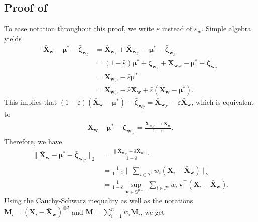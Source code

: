 \documentclass[aos,preprint,reqno]{imsart}
\newcommand\bs{\boldsymbol}
\newcommand\bmu{\boldsymbol\mu}
\newcommand\bzeta{\boldsymbol\zeta}
\newcommand\bv{\boldsymbol v}
\newcommand\bw{\boldsymbol w}
\theoremstyle{plain}
\theoremstyle{remark}
\begin{document}
	\subsection{Proof of }
	To ease notation throughout this proof, we write $\bar\varepsilon$ instead of 
	$\varepsilon_{w}$. Simple algebra yields
	\begin{align}
		\bar{\bs X}_{\bw} - \bmu^* - \bar{\bzeta}_{\bw_{\mathcal I}}  
		    &= \bar{\bs X}_{\bw_{\mathcal I}} + \bar{\bs X}_{\bw_{\mathcal I^c}} 
		        - \bmu^* - \bar{\bzeta}_{\bw_{\mathcal I}}  \\ 
			& = (1-\bar\varepsilon)\bmu^* + \bar{\bzeta}_{\bw_{\mathcal I}} + 
			    \bar{\bs X}_{\bw_{\mathcal I^c}} - \bmu^* - 
			    \bar{\bzeta}_{\bw_{\mathcal I}}\\
			& = \bar{\bs X}_{\bw_{\mathcal I^c}} - \bar\varepsilon\bmu^*\\
			& = \bar{\bs X}_{\bw_{\mathcal I^c}} - \bar\varepsilon\bar{\bs X}_{\bw} 
			    + \bar\varepsilon(\bar{\bs X}_{\bw} - \bmu^* ).
	\end{align}
	This implies that $(1-\bar\varepsilon)(\bar{\bs X}_{\bw} - \bmu^*) - 
	\bar{\bzeta}_{\bw_{\mathcal I}}  = \bar{\bs X}_{\bw_{\mathcal I^c}} 
	- \bar\varepsilon\bar{\bs X}_{\bw}$,  which is equivalent to 
	\begin{align}
			\bar{\bs X}_{\bw} - \bmu^* - \bar{\bzeta}_{\bw_{|\mathcal I}}  
			= \frac{\bar{\bs X}_{\bw_{\mathcal I^c}} - \bar\varepsilon\bar{\bs X}_{\bw}}
			{1-\bar\varepsilon}.\label{eq:p11a}
	\end{align}
	Therefore, we have 
	\begin{align}
		\big\|\bar{\bs X}_{\bw} - \bmu^* - 
		\bar{\bzeta}_{\bw_{|\mathcal I}}\big\|_2  
		& = \frac{\big\|\bar{\bs X}_{\bw_{\mathcal I^c}} - 
		\bar\varepsilon\bar{\bs X}_{\bw}\big\|_2}{1-\bar\varepsilon}\\
		& = \frac1{1-\bar\varepsilon} \bigg\|\sum_{i\in\mathcal I^c} 
		w_i(\bs X_i - \bar{\bs X}_{\bw})\bigg\|_2\\
		& = \frac1{1-\bar\varepsilon} \sup_{\bv\in\mathbb S^{p-1}} \sum_{i\in\mathcal I^c}
		w_i\,\bv^\top(\bs X_i - \bar{\bs X}_{\bw}).
			\label{eq:p11b}
	\end{align}
	Using the Cauchy-Schwarz inequality as well as the notations 
	$\mathbf M_i = (\bs X_i-\bar{\bs X}_{\bw})^{\otimes 2}$ and 
	$\mathbf M = \sum_{i=1}^n w_i\mathbf M_i$, we get
\end{document}
